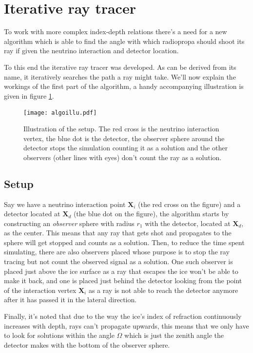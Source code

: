 \section{Iterative ray tracer}
\label{sec:Iterative}
To work with more complex index-depth relations there's a need for a
new algorithm which is able to find the angle with which radiopropa should
shoot its ray if given the neutrino interaction and detector location.

To this end the iterative ray tracer \cite{2022icrc.confE1027O} was developed.
As can be derived from its name, it iteratively searches the path a ray might
take. We'll now explain the workings of the first part of the algorithm, a handy
accompanying illustration is given in figure \ref{fig:Illustration of iterative algorithm}.
\begin{figure}
  \centering
  \texttt{[image: algoillu.pdf]}
  \caption{Illustration of the setup. The red cross is the neutrino interaction vertex, the blue dot is the detector,
  the observer sphere around the detector stops the simulation counting it as a solution and the other observers (other lines with eyes) don't count the ray as a solution.}
  \label{fig:Illustration of iterative algorithm}
\end{figure}
\subsection{Setup}
Say we have a neutrino interaction point $\mathbf{X}_i$
(the red cross on the figure) and a detector located at $\mathbf{X}_d$ (the
blue dot on the figure), the algorithm starts by constructing an
\textit{observer} sphere with radius $r_1$ with the detector, located at $\mathbf{X}_d$, as the
center.  This means that any ray that gets shot and propagates to the sphere
will get stopped and counts as a solution.  Then, to reduce the time spent simulating, there are also observers placed
whose purpose is to stop the ray tracing but not count the observed signal as a solution.
One such observer is placed 
just above the ice surface as a ray that escapes the ice won't be able to make it back, and one
is placed just behind the detector looking from the point of the interaction vertex $\mathbf{X}_i$ as
a ray is not able to reach the detector anymore after it has passed it in the
lateral direction. 

Finally, it's noted that due to the way the ice's index of refraction
continuously increases with depth, rays can't propagate upwards, this means that we only 
have to look for solutions within the angle $\Omega$ which is just the zenith angle the detector
makes with the bottom of the observer sphere.

